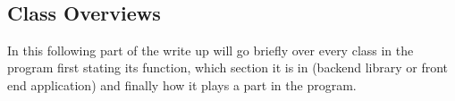 \begin{FlushLeft}
\begin{enumerate}
    \begin{figure}[H]
        \centering
    \end{figure}\\

    \begin{figure}[H]
        \centering
    \end{figure}\\

    \\ \BK


    \\ \bk

    \subsection{Class Overviews}

    In this following part of the write up will go briefly over every class in the program first stating its function, which section it is in (backend library or front end application) and finally how it plays a part in the program.


\end{enumerate}
\end{FlushLeft}
